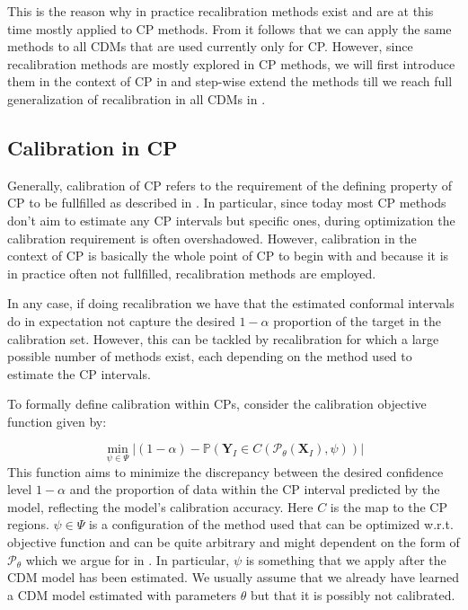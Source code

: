 This is the reason why in practice recalibration methods exist and are at this time mostly applied to CP methods. From  it follows that we can apply the same methods to all CDMs that are used currently only for CP. However, since recalibration methods are mostly explored in CP methods, we will first introduce them in the context of CP in  and step-wise extend the methods till we reach full generalization of recalibration in all CDMs in .

\subsection{Calibration in CP}\label{sec:calibration_cp}
Generally, calibration of CP refers to the requirement of the defining property of CP to be fullfilled as described in . In particular, since today most CP methods don't aim to estimate any CP intervals but specific ones, during optimization the calibration requirement is often overshadowed. However, calibration in the context of CP is basically the whole point of CP to begin with and because it is in practice often not fullfilled, recalibration methods are employed.

In any case, if doing recalibration we have that the estimated conformal intervals do in expectation not capture the desired $1 - \alpha$ proportion of the target in the calibration set. However, this can be tackled by recalibration for which a large possible number of methods exist, each depending on the method used to estimate the CP intervals.

To formally define calibration within CPs, consider the calibration objective function given by:

\begin{equation}
    \min_{\psi \in \Psi} |(1 - \alpha) - \mathbb{P}(\mathbf{Y}_I \in C(\mathscr{P}_{\theta}(\mathbf{X}_I), \psi))|
    \label{eq:calibration_objective_formal}
\end{equation}
This function aims to minimize the discrepancy between the desired confidence level \(1 - \alpha\) and the proportion of data within the CP interval predicted by the model, reflecting the model's calibration accuracy. Here $C$ is the map to the CP regions. $\psi\in\Psi$ is a configuration of the method used that can be optimized w.r.t. objective function and can be quite arbitrary and might dependent on the form of $\mathscr{P}_{\theta}$ which we argue for in . In particular, $\psi$ is something that we apply after the CDM model has been estimated. We usually assume that we already have learned a CDM model estimated with parameters $\theta$ but that it is possibly not calibrated.

